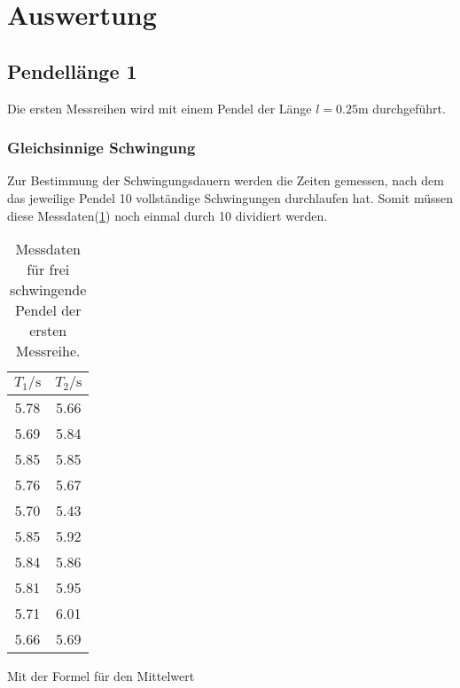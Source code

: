 \newpage
\section{Auswertung}

    \subsection{Pendellänge 1}

        \noindent Die ersten Messreihen wird mit einem Pendel der Länge $l = 0.25 \si{\m}$ durchgeführt.

        \subsubsection{Gleichsinnige Schwingung}

            \noindent Zur Bestimmung der Schwingungsdauern werden die Zeiten gemessen, nach dem das jeweilige Pendel 10 vollständige Schwingungen 
            durchlaufen hat. Somit müssen diese Messdaten(\ref{tab:frei1}) noch einmal durch 10 dividiert werden.

            \begin{table}[ht]
                \centering
                \caption{Messdaten für frei schwingende Pendel der ersten Messreihe.}
                \label{tab:frei1}
                \begin{tabular}{c c}
                 \toprule
                 $T_1 / \si{\s}$ & $T_2 / \si{\s}$\\
                 \midrule
                 5.78  &  5.66 \\
                 5.69  &  5.84 \\
                 5.85  &  5.85 \\
                 5.76  &  5.67 \\
                 5.70  &  5.43 \\
                 5.85  &  5.92 \\
                 5.84  &  5.86 \\
                 5.81  &  5.95 \\
                 5.71  &  6.01 \\
                 5.66  &  5.69 \\
                 \bottomrule
                \end{tabular}
            \end{table}

            \noindent Mit der Formel für den Mittelwert 

